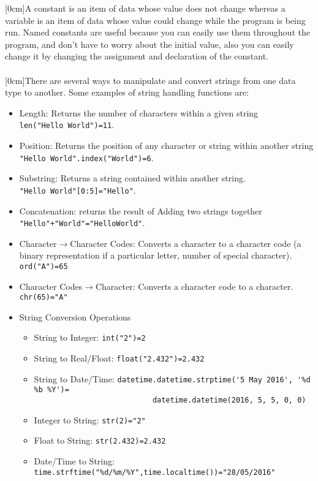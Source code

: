   [0cm]A constant is an item of data whose value does not change whereas a variable is an item of data whose value could change while the program is being run. Named constants are useful because you can easily use them throughout the program, and don't have to worry about the initial value, also you can easily change it by changing the assignment and declaration of the constant.\\ \\
  [0cm]There are several ways to manipulate and convert strings from one data type to another. Some examples of string handling functions are:
  \begin{itemize}
    \setlength\itemsep{0em}
    \item Length: Returns the number of characters within a given string\\
    \verb|len("Hello World")=11|.
    \item Position: Returns the position of any character or string within another string \\
    \verb|"Hello World".index("World")=6|.
    \item Substring: Returns a string contained within another string.\\
    \verb|"Hello World"[0:5]="Hello"|.
    \item Concatenation: returns the result of Adding two strings together \\
    \verb|"Hello"+"World"="HelloWorld"|.
    \item Character$\to$Character Codes: Converts a character to a character code (a binary representation if a particular letter, number of special character).\\
    \verb|ord("A")=65|
    \item Character Codes$\to$Character: Converts a character code to a character.\\
    \verb|chr(65)="A"|
    \item String Conversion Operations
    \begin{itemize}
      \setlength\itemsep{0em}
      \item String to Integer:
        \subitem \verb|int("2")=2|
      \item String to Real/Float:
        \subitem \verb|float("2.432")=2.432|
      \item String to Date/Time:
        \subitem \verb|datetime.datetime.strptime('5 May 2016', '%d %b %Y')=|\\
\verb|                           datetime.datetime(2016, 5, 5, 0, 0)|
      \item Integer to String:
        \subitem \verb|str(2)="2"|
      \item Float to String:
        \subitem \verb|str(2.432)=2.432|
      \item Date/Time to String:
        \subitem \verb|time.strftime("%d/%m/%Y",time.localtime())="28/05/2016"|
    \end{itemize}
  \end{itemize}

